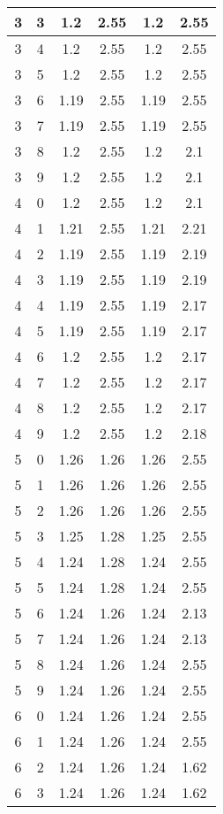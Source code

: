 \begin{longtable}{|c|c||c||c||c|c|}
	3 & 3 & 1.2 & 2.55 & 1.2 & 2.55 \\ \hline
	3 & 4 & 1.2 & 2.55 & 1.2 & 2.55 \\ \hline
	3 & 5 & 1.2 & 2.55 & 1.2 & 2.55 \\ \hline
	3 & 6 & 1.19 & 2.55 & 1.19 & 2.55 \\ \hline
	3 & 7 & 1.19 & 2.55 & 1.19 & 2.55 \\ \hline
	3 & 8 & 1.2 & 2.55 & 1.2 & 2.1 \\ \hline
	3 & 9 & 1.2 & 2.55 & 1.2 & 2.1 \\ \hline
	4 & 0 & 1.2 & 2.55 & 1.2 & 2.1 \\ \hline
	4 & 1 & 1.21 & 2.55 & 1.21 & 2.21 \\ \hline
	4 & 2 & 1.19 & 2.55 & 1.19 & 2.19 \\ \hline
	4 & 3 & 1.19 & 2.55 & 1.19 & 2.19 \\ \hline
	4 & 4 & 1.19 & 2.55 & 1.19 & 2.17 \\ \hline
	4 & 5 & 1.19 & 2.55 & 1.19 & 2.17 \\ \hline
	4 & 6 & 1.2 & 2.55 & 1.2 & 2.17 \\ \hline
	4 & 7 & 1.2 & 2.55 & 1.2 & 2.17 \\ \hline
	4 & 8 & 1.2 & 2.55 & 1.2 & 2.17 \\ \hline
	4 & 9 & 1.2 & 2.55 & 1.2 & 2.18 \\ \hline
	5 & 0 & 1.26 & 1.26 & 1.26 & 2.55 \\ \hline
	5 & 1 & 1.26 & 1.26 & 1.26 & 2.55 \\ \hline
	5 & 2 & 1.26 & 1.26 & 1.26 & 2.55 \\ \hline
	5 & 3 & 1.25 & 1.28 & 1.25 & 2.55 \\ \hline
	5 & 4 & 1.24 & 1.28 & 1.24 & 2.55 \\ \hline
	5 & 5 & 1.24 & 1.28 & 1.24 & 2.55 \\ \hline
	5 & 6 & 1.24 & 1.26 & 1.24 & 2.13 \\ \hline
	5 & 7 & 1.24 & 1.26 & 1.24 & 2.13 \\ \hline
	5 & 8 & 1.24 & 1.26 & 1.24 & 2.55 \\ \hline
	5 & 9 & 1.24 & 1.26 & 1.24 & 2.55 \\ \hline
	6 & 0 & 1.24 & 1.26 & 1.24 & 2.55 \\ \hline
	6 & 1 & 1.24 & 1.26 & 1.24 & 2.55 \\ \hline
	6 & 2 & 1.24 & 1.26 & 1.24 & 1.62 \\ \hline
	6 & 3 & 1.24 & 1.26 & 1.24 & 1.62 \\ \hline

\end{longtable}

